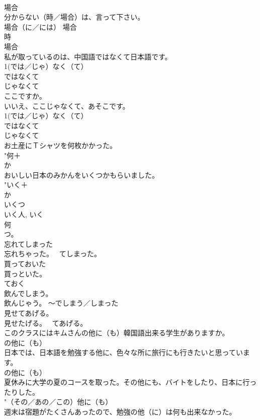 \documentclass[8pt]{extreport}
\begin{document}
\begin{CJK}{UTF8}{min}
{\\	場合 
\\	分からない（時／場合）は、言って下さい。	
\\	場合（に／には） 場合 
\\	時　
\\	場合 
\\	私が取っているのは、中国語ではなくて日本語です。	
\\	1(では／じゃ）なく（て）
\\	ではなくて　
\\	じゃなくて 
\\	ここですか。 
\\	いいえ、ここじゃなくて、あそこです。	
\\	1(では／じゃ）なく（て）
\\	ではなくて　
\\	じゃなくて 
\\	お土産にＴシャツを何枚かかった。	
\\	"何＋
\\	か 
\\	おいしい日本のみかんをいくつかもらいました。	
\\	"いく＋
\\	か 
\\	いくつ　
\\	いく人, いく 
\\	何 
\\	つ。
\\	忘れてしまった 
\\	忘れちゃった。	~てしまった。 
\\	買っておいた 
\\	買っといた。	
\\	ておく 
\\	飲んでしまう。 
\\	飲んじゃう。	〜でしまう／しまった 
\\	見せてあげる。 
\\	見せたげる。	~てあげる。 
\\	このクラスにはキムさんの他に（も）韓国語出来る学生がありますか。	
\\	の他に（も）~~ 
\\	日本では、日本語を勉強する他に、色々な所に旅行にも行きたいと思っています。	
\\	の他に（も）~~ 
\\	夏休みに大学の夏のコースを取った。その他にも、バイトをしたり、日本に行ったりした。	
\\	"（その／あの／この）他に（も）~~ 
\\	週末は宿題がたくさんあったので、勉強の他（に）は何も出来なかった。	
}
\end{CJK}
\end{document}
